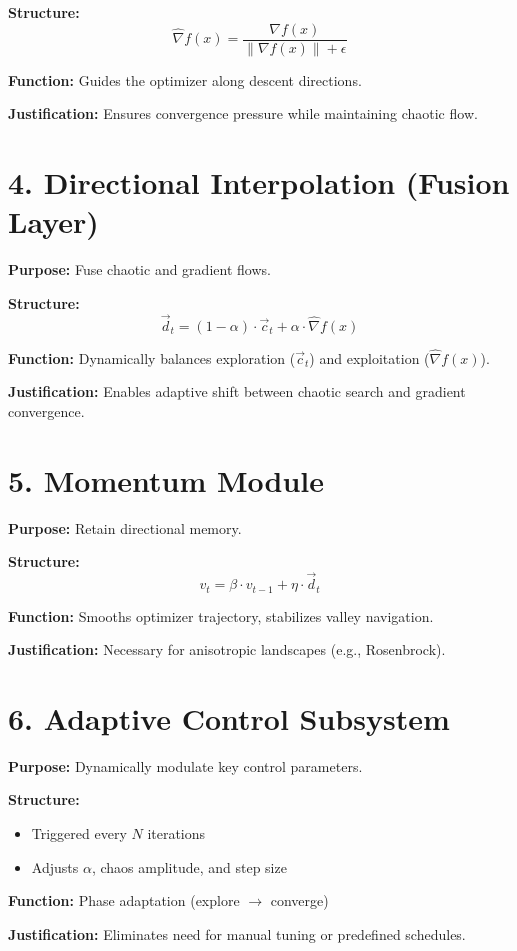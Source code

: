 \documentclass[11pt]{article}
\begin{document}
\textbf{Structure:}
\[
\hat{\nabla}f(x) = \frac{\nabla f(x)}{\|\nabla f(x)\| + \epsilon}
\]

\textbf{Function:} Guides the optimizer along descent directions.

\textbf{Justification:} Ensures convergence pressure while maintaining chaotic flow.

\section*{4. Directional Interpolation (Fusion Layer)}
\textbf{Purpose:} Fuse chaotic and gradient flows.

\textbf{Structure:}
\[
\vec{d}_t = (1 - \alpha) \cdot \vec{c}_t + \alpha \cdot \hat{\nabla}f(x)
\]

\textbf{Function:} Dynamically balances exploration ($\vec{c}_t$) and exploitation ($\hat{\nabla}f(x)$).

\textbf{Justification:} Enables adaptive shift between chaotic search and gradient convergence.

\section*{5. Momentum Module}
\textbf{Purpose:} Retain directional memory.

\textbf{Structure:}
\[
  v_t = \beta \cdot v_{t-1} + \eta \cdot \vec{d}_t
\]

\textbf{Function:} Smooths optimizer trajectory, stabilizes valley navigation.

\textbf{Justification:} Necessary for anisotropic landscapes (e.g., Rosenbrock).

\section*{6. Adaptive Control Subsystem}
\textbf{Purpose:} Dynamically modulate key control parameters.

\textbf{Structure:}
\begin{itemize}[leftmargin=1.5em]
  \item Triggered every $N$ iterations
  \item Adjusts $\alpha$, chaos amplitude, and step size
\end{itemize}

\textbf{Function:} Phase adaptation (explore $\rightarrow$ converge)

\textbf{Justification:} Eliminates need for manual tuning or predefined schedules.
\end{document}
